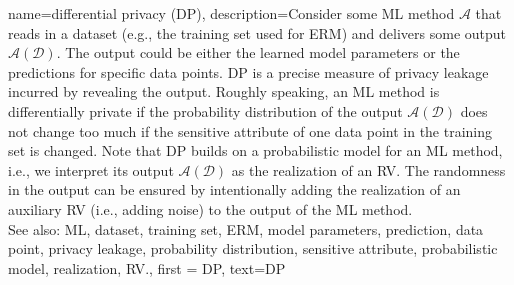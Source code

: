 {name={differential privacy (DP)},
  description={Consider some ML method $\mathcal{A}$ 
  	that reads in a dataset (e.g., the training set 
  	used for ERM) and delivers some output $\mathcal{A}(\mathcal{D})$. The output 
  	could be either the learned model parameters or the predictions for specific data points. 
  	DP is a precise measure of privacy leakage incurred by revealing the 
  	output. Roughly speaking, an ML method is differentially private if the probability distribution 
  	of the output $\mathcal{A}(\mathcal{D})$ does not change too much if the sensitive attribute 
  	of one data point in the training set is changed. Note that DP 
  	builds on a probabilistic model for an ML method, i.e., we interpret its output $\mathcal{A}(\mathcal{D})$ 
  	as the realization of an RV. The randomness in the output can be ensured 
  	by intentionally adding the realization of an auxiliary RV (i.e., adding noise) to 
  	the output of the ML method.
				\\ 
		See also: ML, dataset, training set, ERM, model parameters, prediction, data point, privacy leakage, probability distribution, sensitive attribute, probabilistic model, realization, RV.}, 
	first = {DP}, 
	text={DP} 
}

